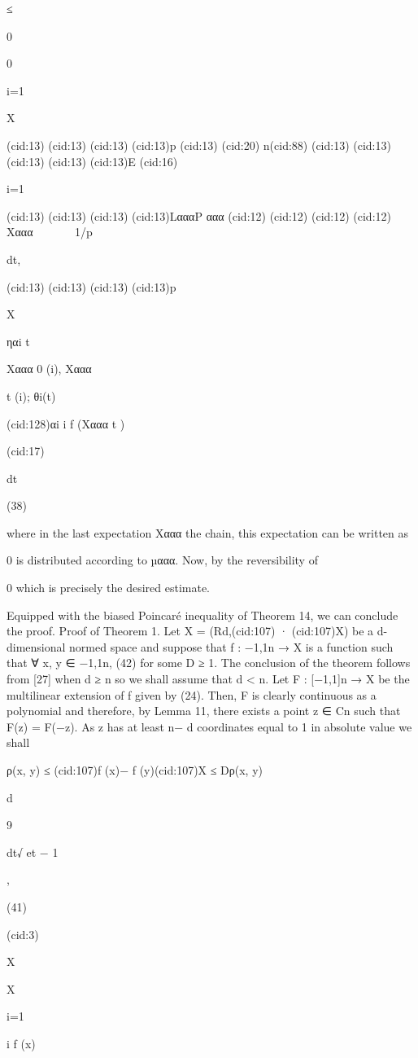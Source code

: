 {≤

0

0

i=1

X

(cid:13)
(cid:13)
(cid:13)
(cid:13)p
(cid:13)
(cid:20) n(cid:88)
(cid:13)
(cid:13)
(cid:13)
(cid:13)
(cid:13)E
(cid:16)

i=1

(cid:13)
(cid:13)
(cid:13)
(cid:13)LαααP ααα
(cid:12)
(cid:12)
(cid:12)
(cid:12) Xααα





1/p

dt,

(cid:13)
(cid:13)
(cid:13)
(cid:13)p

X

ηαi
t

Xααα
0 (i), Xααα

t (i); θi(t)

(cid:128)αi
i f (Xααα
t )

(cid:17)

dt

(38)

where in the last expectation Xααα
the chain, this expectation can be written as

0 is distributed according to µααα. Now, by the reversibility of

0
which is precisely the desired estimate.

Equipped with the biased Poincaré inequality of Theorem 14, we can conclude the proof.
Proof of Theorem 1. Let X = (Rd,(cid:107) · (cid:107)X) be a d-dimensional normed space and suppose that
f : {−1,1}n → X is a function such that
∀ x, y ∈ {−1,1}n,
(42)
for some D ≥ 1. The conclusion of the theorem follows from [27] when d ≥ n so we shall
assume that d < n. Let F : [−1,1]n → X be the multilinear extension of f given by (24). Then, F
is clearly continuous as a polynomial and therefore, by Lemma 11, there exists a point z ∈ Cn
such that F(z) = F(−z). As z has at least n− d coordinates equal to 1 in absolute value we shall

ρ(x, y) ≤ (cid:107)f (x)− f (y)(cid:107)X ≤ Dρ(x, y)

d

9

dt√
et − 1

,

(41)

(cid:3)

X

X

i=1

i f (x)

}
